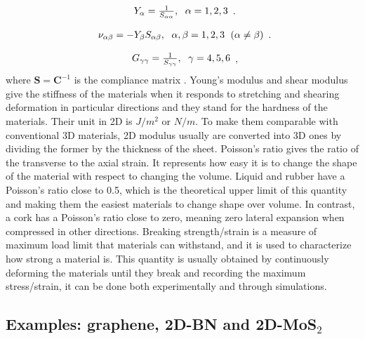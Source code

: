 \begin{equation}
\begin{array}{c}

Y_\alpha=\frac{1}{S_{\alpha\alpha}},\hspace{6 pt} \alpha = 1, 2, 3
\end{array}.
\end{equation}

\begin{equation}
\begin{array}{c}
\nu_{\alpha\beta}=-Y_\beta S_{\alpha\beta},\hspace{6 pt} \alpha, \beta = 1, 2, 3 
\hspace{6 pt}(\alpha\neq\beta)
\end{array}.
\end{equation}

\begin{equation}
\begin{array}{c}
G_{\gamma\gamma}=\frac{1}{S_{\gamma\gamma}} ,\hspace{6 pt} \gamma = 4, 5, 6
\end{array},
\end{equation}
where $\boldsymbol{S}=\boldsymbol{C}^{-1}$ is the compliance matrix \citep[e.g.][]{nye1985physical}. Young's modulus and shear modulus give the stiffness of the materials when it responds to stretching and shearing deformation in particular directions and they stand for the hardness of the materials. Their unit in 2D is $J/m^2$ or $N/m$. To make them comparable with conventional 3D materials, 2D modulus usually are converted into 3D ones by dividing the former by the thickness of the sheet. Poisson's ratio gives the ratio of the transverse to the axial strain. It represents how easy it is to change the shape of the material with respect to changing the volume. Liquid and rubber have a Poisson's ratio close to 0.5, which is the theoretical upper limit of this quantity and making them the easiest materials to change shape over volume. In contrast, a cork has a Poisson's ratio close to zero, meaning zero lateral expansion when compressed in other directions. Breaking strength/strain is a measure of maximum load limit that materials can withstand, and it is used to characterize how strong a material is. This quantity is usually obtained by continuously deforming the materials until they break and recording the maximum stress/strain, it can be done both experimentally and through simulations. 

\subsection{Examples: graphene, 2D-BN and 2D-MoS$_2$}

